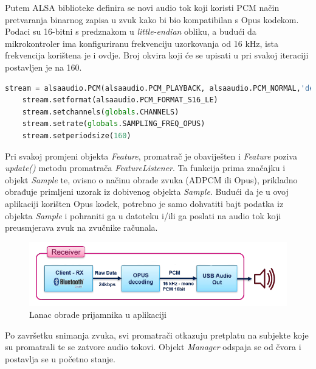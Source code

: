 Putem ALSA biblioteke definira se novi audio tok koji koristi PCM način pretvaranja binarnog zapisa u zvuk kako bi bio kompatibilan s Opus kodekom. Podaci su 16-bitni s predznakom u \textit{little-endian} obliku, a budući da mikrokontroler ima konfiguriranu frekvenciju uzorkovanja od 16 kHz, ista frekvencija korištena je i ovdje. Broj okvira koji će se upisati u pri svakoj iteraciji postavljen je na 160. 

\begin{lstlisting}[language=Python, caption={Postavljanje parametara za dekodiranje audio signala}]
	stream = alsaaudio.PCM(alsaaudio.PCM_PLAYBACK, alsaaudio.PCM_NORMAL,'default')
	stream.setformat(alsaaudio.PCM_FORMAT_S16_LE)
	stream.setchannels(globals.CHANNELS)
	stream.setrate(globals.SAMPLING_FREQ_OPUS)
	stream.setperiodsize(160)
\end{lstlisting}

Pri svakoj promjeni objekta \textit{Feature}, promatrač je obaviješten i \textit{Feature} poziva \textit{update()} metodu promatrača \textit{FeatureListener}. Ta funkcija prima značajku i objekt \textit{Sample} te, ovisno o načinu obrade zvuka (ADPCM ili Opus), prikladno obrađuje primljeni uzorak iz dobivenog objekta \textit{Sample}. Budući da je u ovoj aplikaciji korišten Opus kodek, potrebno je samo dohvatiti bajt podatka iz objekta \textit{Sample} i pohraniti ga u datoteku i/ili ga poslati na audio tok koji preusmjerava zvuk na zvučnike računala. 

\begin{figure}[ht]
	\includegraphics[width=\linewidth]{imgs/duplex_chain_2}
	\caption{Lanac obrade prijamnika u aplikaciji \cite{fpaudbvlink}}
	\label{fig:duplex_chain_2}
\end{figure}

Po završetku snimanja zvuka, svi promatrači otkazuju pretplatu na subjekte koje su promatrali te se zatvore audio tokovi. Objekt \textit{Manager} odspaja se od čvora i postavlja se u početno stanje.